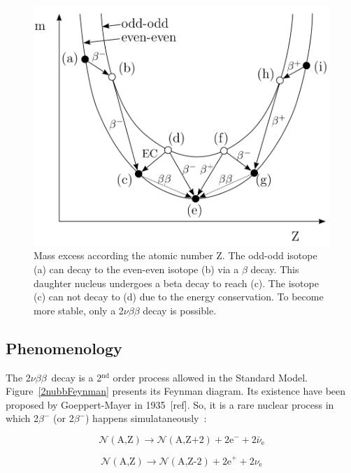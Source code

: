 \documentclass[main.tex]{subfiles}
\begin{document}
\begin{figure}[h!]
\begin{center}
\includegraphics[scale=0.24]{pictures/Chap2/forbiddenBetaDecay.png}
\caption{Mass excess according the atomic number Z. The odd-odd isotope (a) can decay to the even-even isotope (b) via a $\beta$ decay. This daughter nucleus undergoes a beta decay to reach (c). The isotope (c) can not decay to (d) due to the energy conservation. To become more stable, only a 2$\nu\beta\beta$ decay is possible.}
\label{fordiddenBetaDecay}
\end{center}
\end{figure}


\subsection{Phenomenology}


\NI The 2$\nu\beta\beta$~decay is a 2$^{\text{nd}}$ order process allowed in the Standard Model. Figure~\ref{2nubbFeynman} presents its Feynman diagram.  Its existence have been proposed by Goeppert-Mayer in 1935~[ref]. So, it is a rare nuclear process in which 2$\beta^{-}$ (or 2$\beta^{-}$) happens simulataneously~: 


\begin{equation}
\mathcal{N} (\text{A,Z}) \rightarrow \mathcal{N} (\text{A,Z+2}) + \text{2e}^- + \text{2}\bar{\nu}_{\text{e}} 
\end{equation}

\begin{equation}
\mathcal{N} (\text{A,Z}) \rightarrow \mathcal{N} (\text{A,Z-2}) + \text{2e}^+ + \text{2}\nu_{\text{e}} 
\end{equation}
\end{document}
